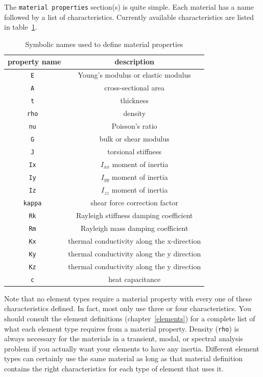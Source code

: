 The {\tt material properties}  section(s) is quite simple.  Each material has a 
name followed by a list of characteristics.  Currently available 
characteristics are listed in table~\ref{materials_table}.
\begin{table}
\begin{center}
\small{
 \begin{tabular}{|c|c|}
  \hline
  property name		& description	\\
  \hline\hline
\tt E 		& Young's modulus or elastic modulus \\
\tt A 		& cross-sectional area  \\
\tt t 		& thickness \\
\tt rho 	& density \\
\tt nu 		& Poisson's ratio \\
\tt G 		& bulk or shear modulus \\
\tt J 		& torsional stiffness \\
\tt Ix		& $I_{xx}$ moment of inertia \\
\tt Iy 		& $I_{yy}$ moment of inertia \\
\tt Iz		& $I_{zz}$ moment of inertia \\
\tt kappa 	& shear force correction factor \\
\tt Rk 		& Rayleigh stiffness damping coefficient \\
\tt Rm 		& Rayleigh mass damping coefficient \\
\tt Kx 		& thermal conductivity along the x-direction \\
\tt Ky 		& thermal conductivity along the y direction \\
\tt Kz 		& thermal conductivity along the y direction \\
\tt c 		& heat capacitance  \\
  \hline
 \end{tabular}
}
\end{center}
\caption{Symbolic names used to define material properties}
\label{materials_table}
\end{table}

Note that no element types require a material 
property with every one of these characteristics defined.  In fact, most 
only use three or four characteristics.  You should consult the element 
definitions (chapter~\ref{elements}) for a complete list of what 
each element type requires from a material property.  Density ({\tt rho}) 
is always necessary for the materials in a 
transient, modal, or spectral analysis problem if you actually want your 
elements to have any inertia. Different element types can certainly use the 
same material as long as that material definition contains the right 
characteristics for each type of element that uses it.	

